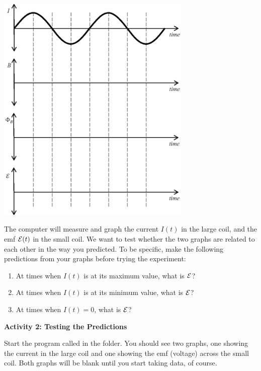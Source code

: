 \begin{center}
    \includegraphics[width=0.7\textwidth]{induction_sinusoidal/sine_curve.eps}
\end{center}

The computer will measure and graph
the current $I(t)$ in the large coil, and the emf ${\cal E}(t)$
in the small coil.  We want to test whether the two graphs are related
to each other in the way you predicted.  To be specific, make the following
predictions from your graphs before trying the experiment:

\begin{enumerate}[labparts]
\item At times when $I(t)$ is at its maximum value, what is ${\cal E}$?
\answerspace{.8in}

\item At times when $I(t)$ is at its minimum value, what is ${\cal E}$?
\answerspace{.8in}

\item At times when $I(t)=0$, what is ${\cal E}$?
\answerspace{.8in}
\end{enumerate}

\pagebreak[2]

{\bf Activity 2: Testing the Predictions}

Start the program called  in the \filename{\coursefolder} folder.  You should see two graphs,
one showing the current in the large coil and one showing the emf (voltage)
across the small coil.  Both graphs will be blank until you start taking
data, of course.  

